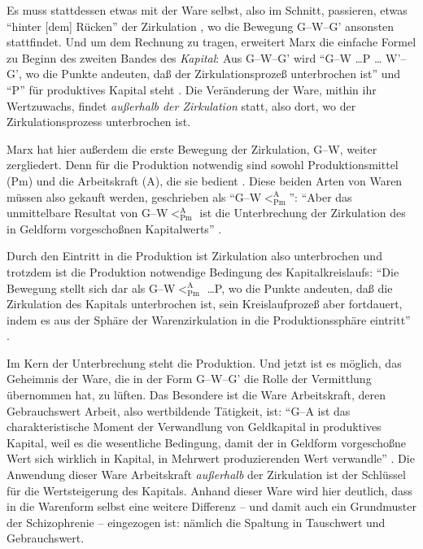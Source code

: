 \documentclass[12pt,
               DIV13,
               paper=a4,
               twoside=false,
               onehalfspacing,
               bibliography=totoc,
               toc=graduated,
               draft,
               ]{scrartcl}
\newcommand{\pc}[2]{\parencite[#1]{#2}}
\newcommand{\vgl}[2]{\parencite[vgl.][#1]{#2}}
\newcommand{\gwg}{G--W--G'\xspace}
\newcommand{\gwapm}{G--W$<^{\text{A}}_{\text{Pm}}$\xspace}
\newcommand{\gwapmp}{G--W$<^{\text{A}}_{\text{Pm}}$ \dots P\xspace}
\begin{document}

Es muss stattdessen etwas mit der Ware selbst, also im Schnitt,
passieren, etwas "`hinter [dem] Rücken"' der Zirkulation
\pc{181}{kap}, wo die Bewegung \gwg ansonsten stattfindet. Und um dem
Rechnung zu tragen, erweitert Marx die einfache Formel zu Beginn des
zweiten Bandes des \emph{Kapital}: Aus \gwg wird "`G--W \dots P \dots
W'--G', wo die Punkte andeuten, daß der Zirkulationsprozeß
unterbrochen ist"' \pc{31}{kap2} und "`P"' für produktives Kapital
steht \vgl{34}{kap2}. Die Veränderung der Ware, mithin ihr
Wertzuwachs, findet \emph{außerhalb der Zirkulation} statt, also dort,
wo der Zirkulationsprozess unterbrochen ist.


Marx hat hier außerdem die erste Bewegung der Zirkulation, G--W,
weiter zergliedert. Denn für die Produktion notwendig sind sowohl
Produktionsmittel (Pm) und die Arbeitskraft (A), die sie bedient
\vgl{32}{kap2}. Diese beiden Arten von Waren müssen also gekauft
werden, geschrieben als "`\gwapm"': "`Aber das unmittelbare Resultat
von \gwapm ist die Unterbrechung der Zirkulation des in Geldform
vorgeschoßnen Kapitalwerts"' \pc{40}{kap2}.

Durch den Eintritt in die Produktion ist Zirkulation also unterbrochen
und trotzdem ist die Produktion notwendige Bedingung des
Kapitalkreislaufs: "`Die Bewegung stellt sich dar als \gwapmp, wo die Punkte andeuten,
daß die Zirkulation des Kapitals unterbrochen ist, sein
Kreislaufprozeß aber fortdauert, indem es aus der Sphäre der
Warenzirkulation in die Produktionssphäre eintritt"' \pc{40}{kap2}.


Im Kern der Unterbrechung steht die Produktion. Und jetzt ist es
möglich, das Geheimnis der Ware, die in der Form \gwg die Rolle der
Vermittlung übernommen hat, zu lüften. Das Besondere ist die Ware
Arbeitskraft, deren Gebrauchswert Arbeit, also wertbildende Tätigkeit,
ist: "`G--A ist das charakteristische Moment der Verwandlung von
Geldkapital in produktives Kapital, weil es die wesentliche Bedingung,
damit der in Geldform vorgeschoßne Wert sich wirklich in Kapital, in
Mehrwert produzierenden Wert verwandle"' \pc{35}{kap2}. Die Anwendung
dieser Ware Arbeitskraft \emph{außerhalb} der Zirkulation ist der
Schlüssel für die Wertsteigerung des Kapitals. Anhand dieser Ware wird
hier deutlich, dass in die Warenform selbst eine weitere Differenz --
und damit auch ein Grundmuster der Schizophrenie -- eingezogen ist:
nämlich die Spaltung in Tauschwert und Gebrauchswert.
\end{document}
